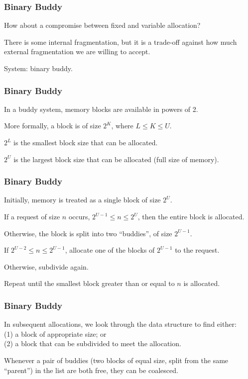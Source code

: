 \begin{frame}
\frametitle{Binary Buddy}
How about a compromise between fixed and variable allocation?

There is some internal fragmentation, but it is a trade-off against how much external fragmentation we are willing to accept.

System: \alert{binary buddy}.


\end{frame}



\begin{frame}
\frametitle{Binary Buddy}

In a buddy system, memory blocks are available in powers of 2. 

More formally, a block is of size $2^{K}$, where $L \leq K \leq U$.

$2^{L}$ is the smallest block size that can be allocated.

$2^{U}$ is the largest block size that can be allocated (full size of memory). 

\end{frame}



\begin{frame}
\frametitle{Binary Buddy}

Initially, memory is treated as a single block of size $2^{U}$. 

If a request of size $n$ occurs, $2^{U-1} \leq n \leq 2^{U}$, then the entire block is allocated. 

Otherwise, the block is split into two ``buddies'', of size $2^{U-1}$. 

If $2^{U-2} \leq n \leq 2^{U-1}$, allocate one of the blocks of $2^{U-1}$ to the request.

Otherwise, subdivide again. 
 
Repeat until the smallest block greater than or equal to $n$ is allocated. 

\end{frame}

\begin{frame}
\frametitle{Binary Buddy}

In subsequent allocations, we look through the data structure to find either:\\
\quad (1) a block of appropriate size; or\\
\quad (2) a block that can be subdivided to meet the allocation. 

Whenever a pair of buddies (two blocks of equal size, split from the same ``parent'') in the list are both free, they can be coalesced.

\end{frame}


